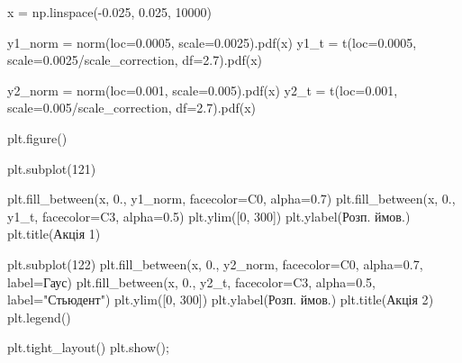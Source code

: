 \documentclass[
  letterpaper,
]{report}
\newenvironment{Shaded}{\begin{snugshade}}{\end{snugshade}}
\newcommand{\DecValTok}[1]{\textcolor[rgb]{0.68,0.00,0.00}{#1}}
\newcommand{\FloatTok}[1]{\textcolor[rgb]{0.68,0.00,0.00}{#1}}
\newcommand{\NormalTok}[1]{\textcolor[rgb]{0.00,0.23,0.31}{#1}}
\newcommand{\OperatorTok}[1]{\textcolor[rgb]{0.37,0.37,0.37}{#1}}
\newcommand{\StringTok}[1]{\textcolor[rgb]{0.13,0.47,0.30}{#1}}
\begin{document}
\begin{Shaded}
\begin{Highlighting}[]
\NormalTok{x }\OperatorTok{=}\NormalTok{ np.linspace(}\OperatorTok{{-}}\FloatTok{0.025}\NormalTok{, }\FloatTok{0.025}\NormalTok{, }\DecValTok{10000}\NormalTok{)}

\NormalTok{y1\_norm }\OperatorTok{=}\NormalTok{ norm(loc}\OperatorTok{=}\FloatTok{0.0005}\NormalTok{, scale}\OperatorTok{=}\FloatTok{0.0025}\NormalTok{).pdf(x)}
\NormalTok{y1\_t }\OperatorTok{=}\NormalTok{ t(loc}\OperatorTok{=}\FloatTok{0.0005}\NormalTok{, scale}\OperatorTok{=}\FloatTok{0.0025}\OperatorTok{/}\NormalTok{scale\_correction, df}\OperatorTok{=}\FloatTok{2.7}\NormalTok{).pdf(x)}

\NormalTok{y2\_norm }\OperatorTok{=}\NormalTok{ norm(loc}\OperatorTok{=}\FloatTok{0.001}\NormalTok{, scale}\OperatorTok{=}\FloatTok{0.005}\NormalTok{).pdf(x)}
\NormalTok{y2\_t }\OperatorTok{=}\NormalTok{ t(loc}\OperatorTok{=}\FloatTok{0.001}\NormalTok{, scale}\OperatorTok{=}\FloatTok{0.005}\OperatorTok{/}\NormalTok{scale\_correction, df}\OperatorTok{=}\FloatTok{2.7}\NormalTok{).pdf(x)}


\NormalTok{plt.figure()}

\NormalTok{plt.subplot(}\DecValTok{121}\NormalTok{)}

\NormalTok{plt.fill\_between(x, }\FloatTok{0.}\NormalTok{, y1\_norm, facecolor}\OperatorTok{=}\StringTok{\textquotesingle{}C0\textquotesingle{}}\NormalTok{, alpha}\OperatorTok{=}\FloatTok{0.7}\NormalTok{)}
\NormalTok{plt.fill\_between(x, }\FloatTok{0.}\NormalTok{, y1\_t, facecolor}\OperatorTok{=}\StringTok{\textquotesingle{}C3\textquotesingle{}}\NormalTok{, alpha}\OperatorTok{=}\FloatTok{0.5}\NormalTok{)}
\NormalTok{plt.ylim([}\DecValTok{0}\NormalTok{, }\DecValTok{300}\NormalTok{])}
\NormalTok{plt.ylabel(}\StringTok{\textquotesingle{}Розп. ймов.\textquotesingle{}}\NormalTok{)}
\NormalTok{plt.title(}\StringTok{\textquotesingle{}Акція 1\textquotesingle{}}\NormalTok{)}

\NormalTok{plt.subplot(}\DecValTok{122}\NormalTok{)}
\NormalTok{plt.fill\_between(x, }\FloatTok{0.}\NormalTok{, y2\_norm, facecolor}\OperatorTok{=}\StringTok{\textquotesingle{}C0\textquotesingle{}}\NormalTok{, alpha}\OperatorTok{=}\FloatTok{0.7}\NormalTok{, label}\OperatorTok{=}\StringTok{\textquotesingle{}Гаус\textquotesingle{}}\NormalTok{)}
\NormalTok{plt.fill\_between(x, }\FloatTok{0.}\NormalTok{, y2\_t, facecolor}\OperatorTok{=}\StringTok{\textquotesingle{}C3\textquotesingle{}}\NormalTok{, alpha}\OperatorTok{=}\FloatTok{0.5}\NormalTok{, label}\OperatorTok{=}\StringTok{"Стьюдент"}\NormalTok{)}
\NormalTok{plt.ylim([}\DecValTok{0}\NormalTok{, }\DecValTok{300}\NormalTok{])}
\NormalTok{plt.ylabel(}\StringTok{\textquotesingle{}Розп. ймов.\textquotesingle{}}\NormalTok{)}
\NormalTok{plt.title(}\StringTok{\textquotesingle{}Акція 2\textquotesingle{}}\NormalTok{)}
\NormalTok{plt.legend()}

\NormalTok{plt.tight\_layout()}
\NormalTok{plt.show()}\OperatorTok{;} 
\end{Highlighting}
\end{Shaded}
\end{document}
